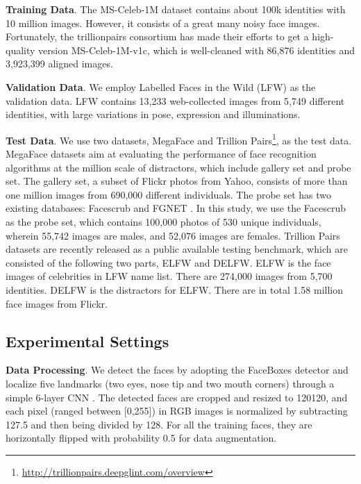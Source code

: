 \documentclass[10pt,twocolumn,letterpaper]{article}
\begin{document}
\noindent \textbf{Training Data}. The MS-Celeb-1M dataset \cite{Msceleb} contains about 100k identities with 10 million images. However, it consists of a great many noisy face images. Fortunately, the trillionpairs consortium has made their efforts to get a high-quality version MS-Celeb-1M-v1c, which is well-cleaned with 86,876 identities and 3,923,399 aligned images.



\noindent \textbf{Validation Data}. We employ Labelled Faces in the Wild (LFW) \cite{LFW} as the validation data. LFW contains 13,233 web-collected images from 5,749 different identities, with large variations in pose, expression and illuminations.




\noindent \textbf{Test Data}. We use two datasets, MegaFace \cite{megaface_1} and Trillion Pairs\footnote{\url{http://trillionpairs.deepglint.com/overview}}, as the test data. MegaFace datasets aim at evaluating the performance of face recognition algorithms at the million scale of distractors, which include gallery set and probe set. The gallery set, a subset of Flickr photos from Yahoo, consists of more than one million images from 690,000 different individuals. The probe set has two existing databases: Facescrub \cite{facescrub} and FGNET \cite{fgnet}. In this study, we use the Facescrub as the probe set, which contains 100,000 photos of 530 unique individuals, wherein 55,742 images are males, and 52,076 images are females. Trillion Pairs datasets are recently released as a public available testing benchmark, which are consisted of the following two parts, ELFW and DELFW. ELFW is the face images of celebrities in LFW name list. There are 274,000 images from 5,700 identities. DELFW is the distractors for ELFW. There are in total 1.58 million face images from Flickr.



\subsection{Experimental Settings}
\noindent \textbf{Data Processing}.
We detect the faces by adopting the FaceBoxes detector \cite{facebox} and localize five landmarks (two eyes, nose tip and two mouth corners) through a simple 6-layer CNN \cite{feng2017wing}. The detected faces are cropped and resized to 120120, and each pixel (ranged between [0,255]) in RGB images is normalized by subtracting 127.5 and then being divided by 128. For all the training faces, they are horizontally flipped with probability 0.5 for data augmentation.
\end{document}
